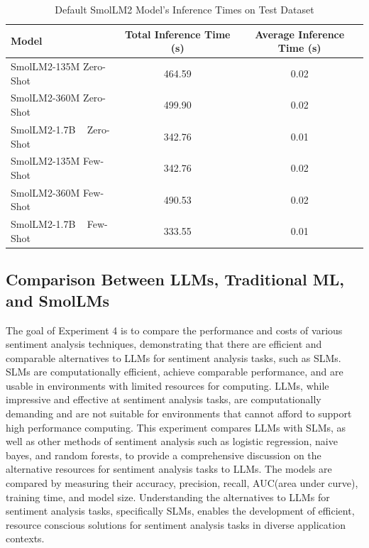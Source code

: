 \documentclass[10pt,twocolumn,letterpaper]{article}
\begin{document}
\begin{table}
\begin{center}
\begin{tabular}{|l|c|c|}
\hline
Model & Total Inference Time (s) & Average Inference Time (s)  \\
\hline\hline
SmolLM2-135M Zero-Shot   & 464.59 & 0.02    \\

SmolLM2-360M Zero-Shot   & 499.90 & 0.02    \\

SmolLM2-1.7B ~ Zero-Shot & 342.76 & 0.01    \\

SmolLM2-135M Few-Shot    & 342.76 & 0.02    \\

SmolLM2-360M Few-Shot    & 490.53 & 0.02    \\

SmolLM2-1.7B ~ Few-Shot  & 333.55 & 0.01    \\
\hline
\end{tabular}
\end{center}
\caption{Default SmolLM2 Model's Inference Times on Test Dataset}
\label{tab:default-smollm-times}
\end{table}






\subsection{Comparison Between LLMs, Traditional ML, and SmolLMs}
The goal of Experiment 4 is to compare the performance and costs of various sentiment analysis techniques, demonstrating that there are efficient and comparable alternatives to LLMs for sentiment analysis tasks, such as SLMs. SLMs are computationally efficient, achieve comparable performance, and are usable in environments with limited resources for computing. LLMs, while impressive and effective at sentiment analysis tasks, are computationally demanding and are not suitable for environments that cannot afford to support high performance computing. This experiment compares LLMs with SLMs, as well as other methods of sentiment analysis such as logistic regression, naive bayes, and random forests, to provide a comprehensive discussion on the alternative resources for sentiment analysis tasks to LLMs. The models are compared by measuring their accuracy, precision, recall, AUC(area under curve), training time, and model size. Understanding the alternatives to LLMs for sentiment analysis tasks, specifically SLMs, enables the development of efficient, resource conscious solutions for sentiment analysis tasks in diverse application contexts.
\end{document}
